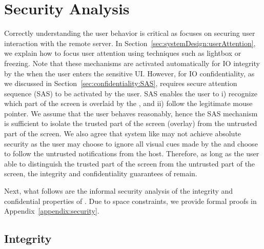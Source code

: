 \section{Security Analysis}
\label{sec:securityAnalysis}



 Correctly understanding the user behavior is critical as \name focuses on securing user interaction with the remote server. In Section~\ref{sec:systemDesign:userAttention}, we explain how to focus user attention using techniques such as lightbox or freezing. Note that these mechanisms are activated automatically for IO integrity by the \device when the user enters the sensitive UI. However, for IO confidentiality, as we discussed in Section~\ref{sec:confidentiality:SAS}, \name requires secure attention sequence (SAS) to be activated by the user. SAS enables the user to i) recognize which part of the screen is overlaid by the \device, and ii) follow the legitimate mouse pointer. We assume that the user behaves reasonably, hence the SAS mechanism is sufficient to isolate the trusted part of the screen (\device overlay) from the untrusted part of the screen. We also agree that system like \name may not achieve absolute security as the user may choose to ignore all visual cues made by the \device and choose to follow the untrusted notifications from the host. Therefore, as long as the user able to distinguish the trusted part of the screen from the untrusted part of the screen, the integrity and confidentiality guarantees of \name remain.

Next, what follows are the informal security analysis of the integrity and confidential properties of \name. Due to space constraints, we provide formal proofs in Appendix~\ref{appendix:security}.


\subsection{Integrity}
\label{sec:securityAnalysis:integrity}


